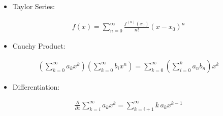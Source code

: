 \begin{itemize}
\tightlist
\item
  Taylor Series:
\end{itemize}

\begin{align*}
f ( x ) = \sum _ { n = 0 } ^ { \infty } \frac { f ^ { ( n ) } \left( x _ { 0 } \right) } { n ! } \left( x - x _ { 0 } \right) ^ { n }
\end{align*}

\begin{itemize}
\tightlist
\item
  Cauchy Product:
\end{itemize}

\begin{align*}
\left( \sum_{k=0}^\infty a_k x^k \right)\left( \sum_{k=0}^\infty b_i x^n \right) = \sum_{k=0}^\infty \left( \sum_{i=0}^k a_{n} b_{n} \right)x^k
\end{align*}

\begin{itemize}
\tightlist
\item
  Differentiation:
\end{itemize}

\begin{align*}
\frac{\partial}{\partial x} \sum_{k=i}^\infty a_kx^k = \sum_{k=i+1}^\infty k\,a_k x^{k-1}
\end{align*}

